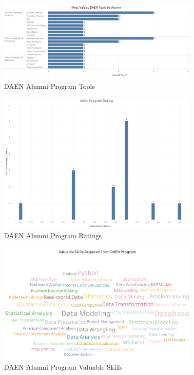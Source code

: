 \documentclass[12pt,a4paper]{article}
\begin{document}
\begin{figure}[H]
    \centering
    \includegraphics[width=0.9\textwidth]{visualizations/daen-tools.png}
    \caption{DAEN Alumni Program Tools}
    \label{fig:daen-tools}
\end{figure}

\begin{figure}[H]
    \centering
    \includegraphics[width=0.9\textwidth]{visualizations/daen-rating.png}
    \caption{DAEN Alumni Program Ratings}
    \label{fig:daen-rating}
\end{figure}

\begin{figure}[H]
    \centering
    \includegraphics[width=0.9\textwidth]{visualizations/program-skills.png}
    \caption{DAEN Alumni Program Valuable Skills}
    \label{fig:program-skills}
\end{figure}
\end{document}

